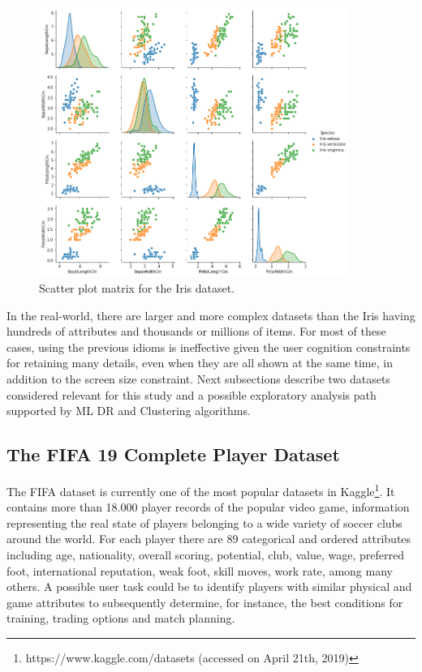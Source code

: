 \begin{figure}[ht]
 \centering
 \includegraphics[width=0.9\textwidth]{iris-scatterplot.png}
 \caption{Scatter plot matrix for the Iris dataset.}
 \label{fig:iris-scatterplot}
\end{figure}

In the real-world, there are larger and more complex datasets than the Iris having hundreds of attributes and thousands or millions of items. For most of these cases, using the previous idioms is ineffective given the user cognition constraints for retaining many details, even when they are all shown at the same time, in addition to the screen size constraint. Next subsections describe two datasets considered relevant for this study and a possible exploratory analysis path supported by ML DR and Clustering algorithms.

\subsection{The FIFA 19 Complete Player Dataset}
\label{subsection1.1.1}

The FIFA dataset is currently one of the most popular datasets in Kaggle\footnote{https://www.kaggle.com/datasets (accessed on April 21th, 2019)}. It contains more than 18.000 player records of the popular video game, information representing the real state of players belonging to a wide variety of soccer clubs around the world. For each player there are 89 categorical and ordered attributes including age, nationality, overall scoring, potential, club, value, wage, preferred foot, international reputation, weak foot, skill moves, work rate, among many others. A possible user task could be to identify players with similar physical and game attributes to subsequently determine, for instance, the best conditions for training, trading options and match planning.


